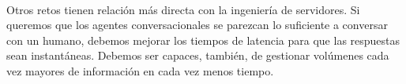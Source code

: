 \documentclass[paper=a4, fontsize=10pt]{scrartcl} %
\numberwithin{equation}{section} %
\numberwithin{figure}{section} %
\numberwithin{table}{section} %
\begin{document}
\

Otros retos tienen relación más directa con la ingeniería de servidores. Si queremos que los agentes conversacionales se parezcan lo suficiente a conversar con un humano, debemos mejorar los tiempos de latencia para que las respuestas sean instantáneas. Debemos ser capaces, también, de gestionar volúmenes cada vez mayores de información en cada vez menos tiempo.

\newpage
\end{document}
